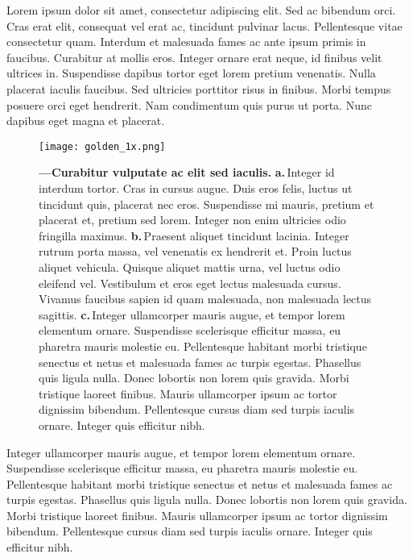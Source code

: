 \documentclass[11pt, a4paper]{report}
\newcommand{\figwid}{5.8in}
\begin{document}
\par Lorem ipsum dolor sit amet, consectetur adipiscing elit. Sed ac bibendum orci. Cras erat elit, consequat vel erat ac, tincidunt pulvinar lacus. Pellentesque vitae consectetur quam. Interdum et malesuada fames ac ante ipsum primis in faucibus. Curabitur at mollis eros. Integer ornare erat neque, id finibus velit ultrices in. Suspendisse dapibus tortor eget lorem pretium venenatis. Nulla placerat iaculis faucibus. Sed ultricies porttitor risus in finibus. Morbi tempus posuere orci eget hendrerit. Nam condimentum quis purus ut porta. Nunc dapibus eget magna et placerat.

\begin{figure}[t!] %
		\centering				
		\texttt{[image: golden\_1x.png]}		
		\caption[A standard figure]
		{ \textbf{---\;Curabitur vulputate ac elit sed iaculis.}
		\textbf{a.}\,Integer id interdum tortor. Cras in cursus augue. Duis eros felis, luctus ut tincidunt quis, placerat nec eros. Suspendisse mi mauris, pretium et placerat et, pretium sed lorem. Integer non enim ultricies odio fringilla maximus.
		\textbf{b.}\,Praesent aliquet tincidunt lacinia. Integer rutrum porta massa, vel venenatis ex hendrerit et. Proin luctus aliquet vehicula. Quisque aliquet mattis urna, vel luctus odio eleifend vel. Vestibulum et eros eget lectus malesuada cursus. Vivamus faucibus sapien id quam malesuada, non malesuada lectus sagittis. 
		\textbf{c.}\,Integer ullamcorper mauris augue, et tempor lorem elementum ornare. Suspendisse scelerisque efficitur massa, eu pharetra mauris molestie eu. Pellentesque habitant morbi tristique senectus et netus et malesuada fames ac turpis egestas. Phasellus quis ligula nulla. Donec lobortis non lorem quis gravida. Morbi tristique laoreet finibus. Mauris ullamcorper ipsum ac tortor dignissim bibendum. Pellentesque cursus diam sed turpis iaculis ornare. Integer quis efficitur nibh.
		}
\label{fig:myfig}  %
\end{figure}

\par Integer ullamcorper mauris augue, et tempor lorem elementum ornare. Suspendisse scelerisque efficitur massa, eu pharetra mauris molestie eu. Pellentesque habitant morbi tristique senectus et netus et malesuada fames ac turpis egestas. Phasellus quis ligula nulla. Donec lobortis non lorem quis gravida. Morbi tristique laoreet finibus. Mauris ullamcorper ipsum ac tortor dignissim bibendum. Pellentesque cursus diam sed turpis iaculis ornare. Integer quis efficitur nibh.
\end{document}
